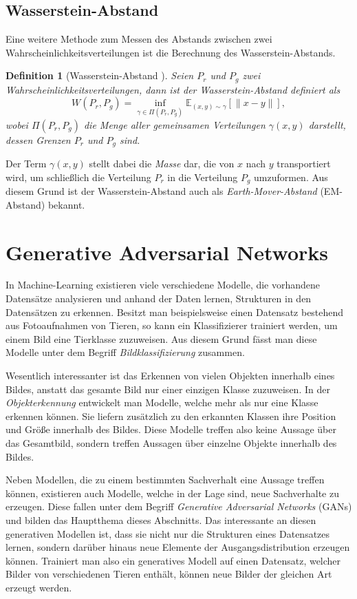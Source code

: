 \documentclass{hsflensburg}
\newtheorem{definition}{Definition}
\begin{document}
  \section{Wasserstein-Abstand}
  Eine weitere Methode zum Messen des Abstands zwischen zwei
  Wahrscheinlichkeitsverteilungen ist die Berechnung des Wasserstein-Abstands.

  \begin{definition}[Wasserstein-Abstand \cite{arjovsky2017wasserstein}]
    Seien $P_r$ und $P_g$ zwei Wahrscheinlichkeitsverteilungen, dann ist der
    Wasserstein-Abstand definiert als
    \[
      W(P_r, P_g) = \inf_{\gamma \in \Pi(P_r, P_g)} \mathbb{E}_{(x, y) \sim \gamma} \left[\|x - y\|\right],
    \]
    wobei $\Pi(P_r, P_g)$ die Menge aller gemeinsamen Verteilungen $\gamma(x,
    y)$ darstellt, dessen Grenzen $P_r$ und $P_g$ sind.
  \end{definition}

  Der Term $\gamma(x, y)$ stellt dabei die \textit{Masse} dar, die von $x$ nach
  $y$ transportiert wird, um schließlich die Verteilung $P_r$ in die Verteilung
  $P_g$ umzuformen. Aus diesem Grund ist der Wasserstein-Abstand auch als
  \textit{Earth-Mover-Abstand} (EM-Abstand) bekannt.

  \chapter{Generative Adversarial Networks}\label{chapter:gans}
  In Machine-Learning existieren viele verschiedene Modelle, die vorhandene
  Datensätze analysieren und anhand der Daten lernen, Strukturen in den
  Datensätzen zu erkennen.  Besitzt man beispielsweise einen Datensatz
  bestehend aus Fotoaufnahmen von Tieren, so kann ein Klassifizierer trainiert
  werden, um einem Bild eine Tierklasse zuzuweisen. Aus diesem Grund fässt man
  diese Modelle unter dem Begriff \textit{Bildklassifizierung} zusammen.

  Wesentlich interessanter ist das Erkennen von vielen Objekten innerhalb eines
  Bildes, anstatt das gesamte Bild nur einer einzigen Klasse zuzuweisen. In der
  \textit{Objekterkennung} entwickelt man Modelle, welche mehr als nur eine
  Klasse erkennen können. Sie liefern zusätzlich zu den erkannten Klassen ihre
  Position und Größe innerhalb des Bildes. Diese Modelle treffen also keine
  Aussage über das Gesamtbild, sondern treffen Aussagen über einzelne Objekte
  innerhalb des Bildes.

  Neben Modellen, die zu einem bestimmten Sachverhalt eine Aussage treffen
  können, existieren auch Modelle, welche in der Lage sind, neue Sachverhalte zu
  erzeugen. Diese fallen unter dem Begriff \textit{Generative Adversarial
  Networks} (GANs) und bilden das Hauptthema dieses Abschnitts. Das interessante
  an diesen generativen Modellen ist, dass sie nicht nur die Strukturen eines
  Datensatzes lernen, sondern darüber hinaus neue Elemente der
  Ausgangsdistribution erzeugen können. Trainiert man also ein generatives
  Modell auf einen Datensatz, welcher Bilder von verschiedenen Tieren enthält,
  können neue Bilder der gleichen Art erzeugt werden.
  
\end{document}
